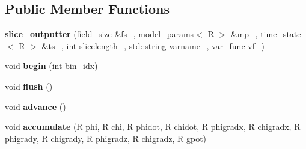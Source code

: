 \subsection*{Public Member Functions}
\begin{DoxyCompactItemize}
\item 
\hypertarget{classslice__outputter_a6ea080464c3e9dbe3d85414335e37e84}{
{\bfseries slice\_\-outputter} (\hyperlink{structfield__size}{field\_\-size} \&fs\_\-, \hyperlink{structmodel__params}{model\_\-params}$<$ R $>$ \&mp\_\-, \hyperlink{structtime__state}{time\_\-state}$<$ R $>$ \&ts\_\-, int slicelength\_\-, std::string varname\_\-, var\_\-func vf\_\-)}
\label{classslice__outputter_a6ea080464c3e9dbe3d85414335e37e84}

\item 
\hypertarget{classslice__outputter_a4a9c77e60f5bc6b7f83e2063e5d6e334}{
void {\bfseries begin} (int bin\_\-idx)}
\label{classslice__outputter_a4a9c77e60f5bc6b7f83e2063e5d6e334}

\item 
\hypertarget{classslice__outputter_aa9fe19a69c103855544940ad2b32c01a}{
void {\bfseries flush} ()}
\label{classslice__outputter_aa9fe19a69c103855544940ad2b32c01a}

\item 
\hypertarget{classslice__outputter_a5d9762160a8e538880df5ff44b84f3c6}{
void {\bfseries advance} ()}
\label{classslice__outputter_a5d9762160a8e538880df5ff44b84f3c6}

\item 
\hypertarget{classslice__outputter_a8ec331e66afb581d8d70bd5630e7f857}{
void {\bfseries accumulate} (R phi, R chi, R phidot, R chidot, R phigradx, R chigradx, R phigrady, R chigrady, R phigradz, R chigradz, R gpot)}
\label{classslice__outputter_a8ec331e66afb581d8d70bd5630e7f857}

\end{DoxyCompactItemize}
